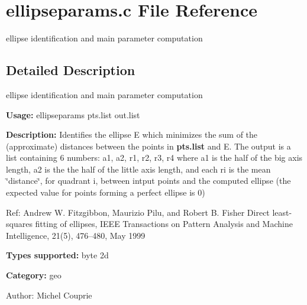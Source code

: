 \section{ellipseparams.c File Reference}
\label{ellipseparams_8c}
ellipse identification and main parameter computation 



\subsection{Detailed Description}
ellipse identification and main parameter computation 

{\bf Usage:} ellipseparams pts.list out.list

{\bf Description:} Identifies the ellipse E which minimizes the sum of the (approximate) distances between the points in {\bf pts.list} and E. The output is a list containing 6 numbers: a1, a2, r1, r2, r3, r4 where a1 is the half of the big axis length, a2 is the the half of the little axis length, and each ri is the mean \char`\"{}distance\char`\"{}, for quadrant i, between intput points and the computed ellipse (the expected value for points forming a perfect ellipse is 0)

Ref: Andrew W. Fitzgibbon, Maurizio Pilu, and Robert B. Fisher Direct least-squares fitting of ellipses, IEEE Transactions on Pattern Analysis and Machine Intelligence, 21(5), 476--480, May 1999

{\bf Types supported:} byte 2d

{\bf Category:} geo

\begin{Desc}
\item[Author:]Michel Couprie \end{Desc}
